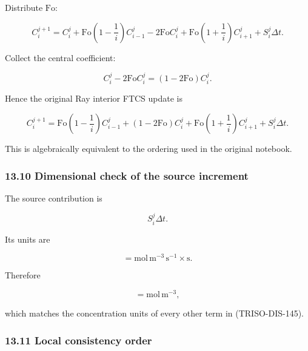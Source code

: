 \documentclass[11pt,a4paper]{article}
\begin{document}
Distribute $\mathrm{Fo}$:

\begin{equation}
C_i^{j+1}
=
C_i^j
+
\mathrm{Fo}
\left(
1-\frac1i
\right)C_{i-1}^j
-
2\mathrm{Fo}C_i^j
+
\mathrm{Fo}
\left(
1+\frac1i
\right)C_{i+1}^j
+
S_i^j\Delta t.
\tag{TRISO-DIS-143}
\label{eq:triso-dis-143}
\end{equation}

Collect the central coefficient:

\begin{equation}
C_i^j-2\mathrm{Fo}C_i^j
=
(1-2\mathrm{Fo})C_i^j.
\tag{TRISO-DIS-144}
\label{eq:triso-dis-144}
\end{equation}

Hence the original Ray interior FTCS update is

\begin{equation}
\boxed{
C_i^{j+1}
=
\mathrm{Fo}
\left(
1-\frac1i
\right)C_{i-1}^j
+
(1-2\mathrm{Fo})C_i^j
+
\mathrm{Fo}
\left(
1+\frac1i
\right)C_{i+1}^j
+
S_i^j\Delta t.
}
\tag{TRISO-DIS-145}
\label{eq:triso-dis-145}
\end{equation}

This is algebraically equivalent to the ordering used in the original notebook.

\subsubsection*{13.10 Dimensional check of the source increment}

The source contribution is

\begin{equation}
S_i^j\Delta t.
\tag{TRISO-DIS-146}
\label{eq:triso-dis-146}
\end{equation}

Its units are

\begin{equation}
[S_i^j\Delta t]
=
\mathrm{mol\,m^{-3}\,s^{-1}}
\times
\mathrm{s}.
\tag{TRISO-DIS-147}
\label{eq:triso-dis-147}
\end{equation}

Therefore

\begin{equation}
[S_i^j\Delta t]
=
\mathrm{mol\,m^{-3}},
\tag{TRISO-DIS-148}
\label{eq:triso-dis-148}
\end{equation}

which matches the concentration units of every other term in (TRISO-DIS-145).

\subsubsection*{13.11 Local consistency order}
\end{document}
